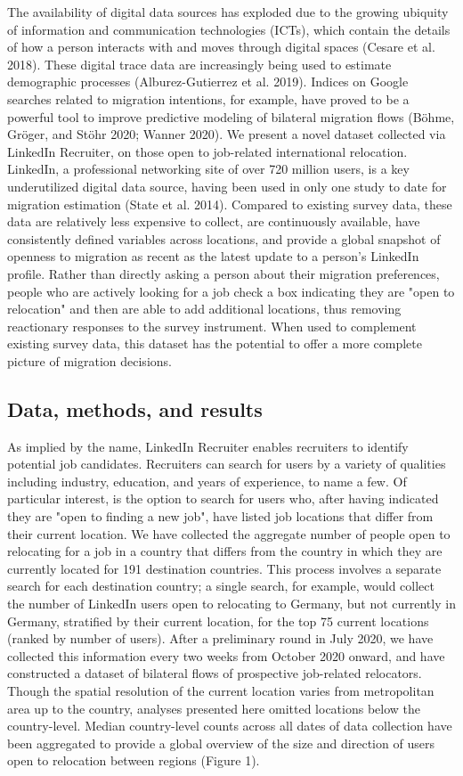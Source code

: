 The availability of digital data sources has exploded due to the growing ubiquity of information and communication technologies (ICTs), which contain the details of how a person interacts with and moves through digital spaces (Cesare et al. 2018). These digital trace data are increasingly being used to estimate demographic processes (Alburez-Gutierrez et al. 2019). Indices on Google searches related to migration intentions, for example, have proved to be a powerful tool to improve predictive modeling of bilateral migration flows (Böhme, Gröger, and Stöhr 2020; Wanner 2020). We present a novel dataset collected via LinkedIn Recruiter, on those open to job-related international relocation. LinkedIn, a professional networking site of over 720 million users, is a key underutilized digital data source, having been used in only one study to date for migration estimation (State et al. 2014). Compared to existing survey data, these data are relatively less expensive to collect, are continuously available, have consistently defined variables across locations, and provide a global snapshot of openness to migration as recent as the latest update to a person’s LinkedIn profile. Rather than directly asking a person about their migration preferences, people who are actively looking for a job check a box indicating they are "open to relocation" and then are able to add additional locations, thus removing reactionary responses to the survey instrument. When used to complement existing survey data, this dataset has the potential to offer a more complete picture of migration decisions.

\subsection*{Data, methods, and results}
As implied by the name, LinkedIn Recruiter enables recruiters to identify potential job candidates. Recruiters can search for users by a variety of qualities including industry, education, and years of experience, to name a few. Of particular interest, is the option to search for users who, after having indicated they are "open to finding a new job", have listed job locations that differ from their current location. We have collected the aggregate number of people open to relocating for a job in a country that differs from the country in which they are currently located for 191 destination countries. This process involves a separate search for each destination country; a single search, for example, would collect the number of LinkedIn users open to relocating to Germany, but not currently in Germany, stratified by their current location, for the top 75 current locations (ranked by number of users). After a preliminary round in July 2020, we have collected this information every two weeks from October 2020 onward, and have constructed a dataset of bilateral flows of prospective job-related relocators. Though the spatial resolution of the current location varies from metropolitan area up to the country, analyses presented here omitted locations below the country-level. Median country-level counts across all dates of data collection have been aggregated to provide a global overview of the size and direction of users open to relocation between regions (Figure 1).

